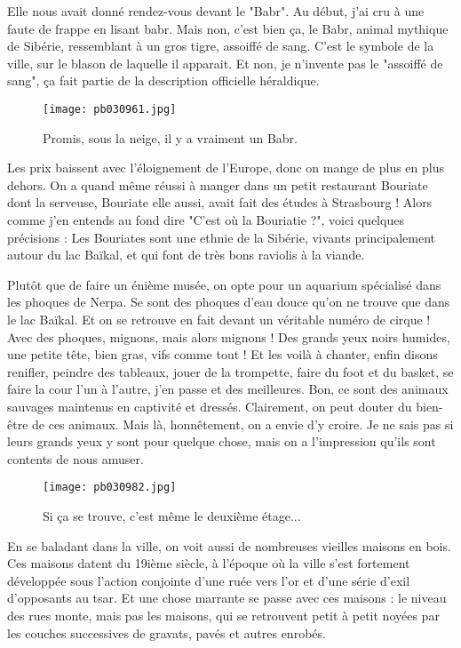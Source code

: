 \documentclass{book}
\begin{document}
Elle nous avait donné rendez-vous devant le "Babr". Au début, j'ai cru à une faute de frappe en lisant babr. Mais non, c'est bien ça, le Babr, animal mythique de Sibérie, ressemblant à un gros tigre, assoiffé de sang. C'est le symbole de la ville, sur le blason de laquelle il apparait. Et non, je n'invente pas le "assoiffé de sang", ça fait partie de la description officielle héraldique.


\begin{figure}[h]
\centering
\texttt{[image: pb030961.jpg]}
\caption*{ Promis, sous la neige, il y a vraiment un Babr.}
\end{figure}

Les prix baissent avec l'éloignement de l'Europe, donc on mange de plus en plus dehors. On a quand même réussi à manger dans un petit restaurant Bouriate dont la serveuse, Bouriate elle aussi, avait fait des études à Strasbourg !
Alors comme j'en entends au fond dire "C'est où la Bouriatie ?", voici quelques précisions : Les Bouriates sont une ethnie de la Sibérie, vivants principalement autour du lac Baïkal, et qui font de très bons raviolis à la viande.

Plutôt que de faire un énième musée, on opte pour un aquarium spécialisé dans les phoques de Nerpa. Se sont des phoques d'eau douce qu'on ne trouve que dans le lac Baïkal. Et on se retrouve en fait devant un véritable numéro de cirque ! Avec des phoques, mignons, mais alors mignons ! Des grands yeux noirs humides, une petite tête, bien gras, vifs comme tout ! Et les voilà à chanter, enfin disons renifler, peindre des tableaux, jouer de la trompette, faire du foot et du basket, se faire la cour l'un à l'autre, j'en passe et des meilleures.
Bon, ce sont des animaux sauvages maintenus en captivité et dressés. Clairement, on peut douter du bien-être de ces animaux. Mais là, honnêtement, on a envie d'y croire. Je ne sais pas si leurs grands yeux y sont pour quelque chose, mais on a l'impression qu'ils sont contents de nous amuser.


\begin{figure}[h]
\centering
\texttt{[image: pb030982.jpg]}
\caption*{ Si ça se trouve, c'est même le deuxième étage...}
\end{figure}

En se baladant dans la ville, on voit aussi de nombreuses vieilles maisons en bois. Ces maisons datent du 19ième siècle, à l'époque où la ville s'est fortement développée sous l'action conjointe d'une ruée vers l'or et d'une série d'exil d'opposants au tsar. Et une chose marrante se passe avec ces maisons : le niveau des rues monte, mais pas les maisons, qui se retrouvent petit à petit noyées par les couches successives de gravats, pavés et autres enrobés.
\end{document}
